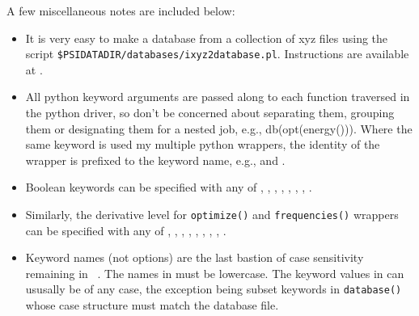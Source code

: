 A few miscellaneous notes are included below:
\begin{itemize}
\item It is very easy to make a database from a collection of xyz files using the script
\texttt{\$PSIDATADIR/databases/ixyz2database.pl}. Instructions are available at 
.
\item All python keyword arguments are passed along to each function traversed in the
python driver, so don't be concerned about separating them, grouping them or
designating them for a nested job, e.g., db(opt(energy())). Where the same keyword is
used my multiple python wrappers, the identity of the wrapper is prefixed to the keyword
name, e.g.,  and .
\item Boolean keywords can be specified with any of , 
, , , , 
, ,  .
\item Similarly, the derivative level for \texttt{optimize()} and \texttt{frequencies()} wrappers
can be specified with any of , , ,
, , ,
, , .
\item Keyword names (not options) are the last bastion of case sensitivity remaining
in \PSIfour\ . The names in  must be lowercase. The keyword
values in  can ususally be of any case, the exception being
subset keywords in \texttt{database()} whose case structure must match the database file.
\end{itemize}

